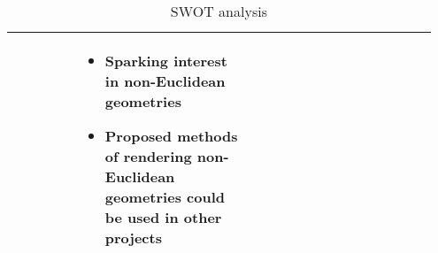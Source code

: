 \begin{table}[H]
\begin{tabular}{|p{0.15\linewidth}|p{0.4\linewidth}|p{0.4\linewidth}|}
\begin{itemize}
        \end{itemize}
                      & \begin{itemize}
                            \itemsep0em
                            \item Sparking interest in non-Euclidean geometries
                            \item Proposed methods of rendering non-Euclidean geometries could be used in other projects
                        \end{itemize}                           \\  \hline
    \end{tabular}
    \caption{SWOT analysis}
    \label{tab:risks}
\end{table}